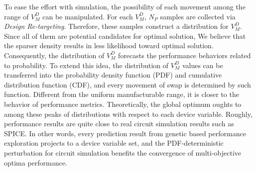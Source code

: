   To ease the effort with simulation, the possibility of each movement among the range of $V^D_M$ can be manipulated. For each $V^D_M$, $N_P$ samples are collected via {\it Design Re-targeting}. Therefore, these samples construct a distribution for $V^D_M$. Since all of them are potential candidates for optimal solution, We believe that the sparser density results in less likelihood toward optimal solution. Consequently, the distribution of $V^D_M$ forecasts the performance behaviors related to probability. To extend this idea, the distribution of $V^D_M$ values can be transferred into the probability density function (PDF) and cumulative distribution function (CDF), and every movement of swap is determined by such function. Different from the uniform manufacturable range, it is closer to the behavior of performance metrics. Theoretically, the global optimum oughts to among these peaks of distributions with respect to each device variable. Roughly, performance results are quite close to real circuit simulation results such as SPICE. In other words, every prediction result from genetic based performance exploration projects to a device variable set, and the PDF-deterministic perturbation for circuit simulation benefits the convergence of multi-objective optima performance.


